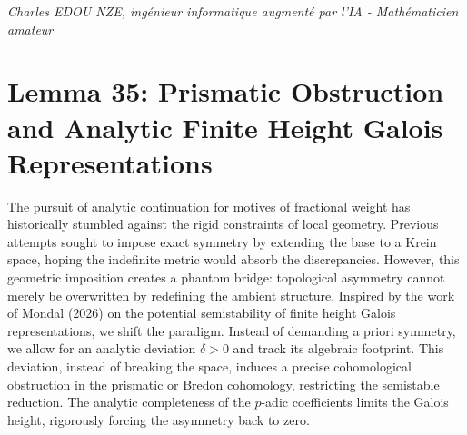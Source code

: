 \documentclass[
]{article}
\begin{document}
\vspace{1cm}
\begin{flushright}
\textit{Charles EDOU NZE, ingénieur informatique augmenté par l'IA - Mathématicien amateur}
\end{flushright}


\section*{Lemma 35: Prismatic Obstruction and Analytic Finite Height Galois Representations}

The pursuit of analytic continuation for motives of fractional weight has historically stumbled against the rigid constraints of local geometry. Previous attempts sought to impose exact symmetry by extending the base to a Krein space, hoping the indefinite metric would absorb the discrepancies. However, this geometric imposition creates a phantom bridge: topological asymmetry cannot merely be overwritten by redefining the ambient structure. Inspired by the work of Mondal (2026) on the potential semistability of finite height Galois representations, we shift the paradigm. Instead of demanding a priori symmetry, we allow for an analytic deviation $\delta > 0$ and track its algebraic footprint. This deviation, instead of breaking the space, induces a precise cohomological obstruction in the prismatic or Bredon cohomology, restricting the semistable reduction. The analytic completeness of the $p$-adic coefficients limits the Galois height, rigorously forcing the asymmetry back to zero.
\end{document}

